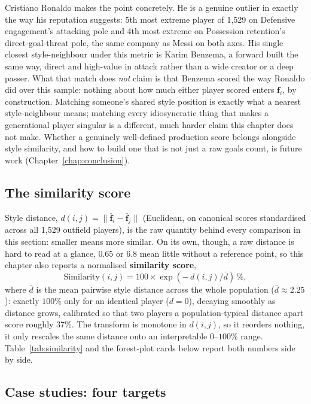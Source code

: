 Cristiano Ronaldo makes the point concretely. He is a genuine outlier in exactly the way his reputation
suggests: 5th most extreme player of 1{,}529 on Defensive engagement's attacking pole and 4th most extreme on
Possession retention's direct-goal-threat pole, the same company as Messi on both axes. His single closest style-neighbour under this
metric is Karim Benzema, a forward built the same way, direct and high-value in attack rather than a wide
creator or a deep passer. What that match does \emph{not} claim is that Benzema scored the way Ronaldo did over
this sample: nothing about how much either player scored enters $\mathbf f_i$, by construction. Matching
someone's shared style position is exactly what a nearest style-neighbour means; matching every idiosyncratic
thing that makes a generational player singular is a different, much harder claim this chapter does not make.
Whether a genuinely well-defined production score belongs alongside style similarity, and how to build one
that is not just a raw goals count, is future work (Chapter~\ref{chap:conclusion}).

\subsection{The similarity score}

Style distance, $d(i,j) = \lVert \bar{\mathbf f}_i - \bar{\mathbf f}_j \rVert$ (Euclidean, on canonical scores
standardised across all 1{,}529 outfield players), is the raw quantity behind every comparison in this
section: smaller means more similar. On its own, though, a raw distance is hard to read at a glance, $0.65$ or
$6.8$ mean little without a reference point, so this chapter also reports a normalised \textbf{similarity
score},
\[
\text{Similarity}(i,j) = 100 \times \exp\!\left(-\, d(i,j) / \bar d\right)\,\%,
\]
where $\bar d$ is the mean pairwise style distance across the whole population ($\bar d \approx 2.25$):
exactly $100\%$ only for an identical player ($d=0$), decaying smoothly as distance grows, calibrated so that
two players a population-typical distance apart score roughly $37\%$. The transform is monotone in $d(i,j)$,
so it reorders nothing, it only rescales the same distance onto an interpretable $0$--$100\%$ range.
Table~\ref{tab:similarity} and the forest-plot cards below report both numbers side by side.

\subsection{Case studies: four targets}

